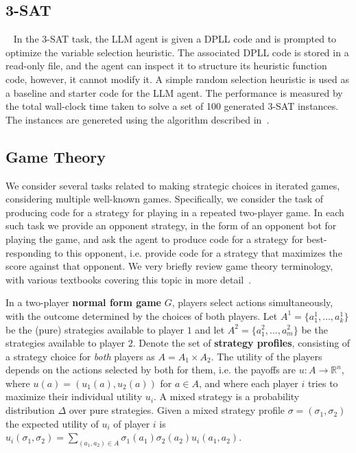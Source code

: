 \subsection{3-SAT}

~\citep{cook1971complexity} In the 3-SAT task, the LLM agent is given a DPLL code and is prompted to optimize the variable selection heuristic.
%
The associated DPLL code is stored in a read-only file, and the agent can inspect it to structure its heuristic function code, however, it cannot modify it.
%
A simple random selection heuristic is used as a baseline and starter code for the LLM agent.
%
The performance is measured by the total wall-clock time taken to solve a set of 100 generated 3-SAT instances. The instances are genereted using the algorithm described in~\citet{selsam2018satAlgorithm}.


\subsection{Game Theory}

We consider several tasks related to making strategic choices in iterated games, considering multiple well-known games.
Specifically, we consider the task of producing code for a strategy for playing in a repeated two-player game.
In each such task we provide an opponent strategy, in the form of an opponent bot for playing the game, and ask the agent to produce code for a strategy for best-responding to this opponent, i.e. provide code for a strategy that maximizes the score against that opponent.
We very briefly review game theory terminology, with various textbooks covering this topic in more detail~\citep{fudenberg1991game}.

In a two-player {\bf normal form game} $G$, players select actions simultaneously, with the outcome determined by the choices of both players.
Let $A^1 = \{ a^1_1, \ldots, a^1_k \}$ be the (pure) strategies available to player $1$ and let $A^2 = \{ a^2_1, \ldots, a^2_m \}$ be the strategies available to player $2$.
Denote the set of {\bf strategy profiles}, consisting of a strategy choice for {\it both} players as $A = A_1 \times A_2$.
The utility of the players depends on the actions selected by both for them, i.e. the payoffs are $u: A \rightarrow \mathbb{R}^n$,  where $u(a) = (u_1(a), u_2(a))$ for $a \in A$, and where each player $i$ tries to maximize their individual utility $u_i$.
A mixed strategy is a probability distribution $\Delta$ over pure strategies.
Given a mixed strategy profile $\sigma = (\sigma_1,\sigma_2)$ the expected utility of $u_i$ of player $i$ is 
$    u_i(\sigma_1, \sigma_2) = \sum_{(a_1, a_2) \in A} \sigma_1(a_1) \sigma_2(a_2) u_i(a_1, a_2)$. 

